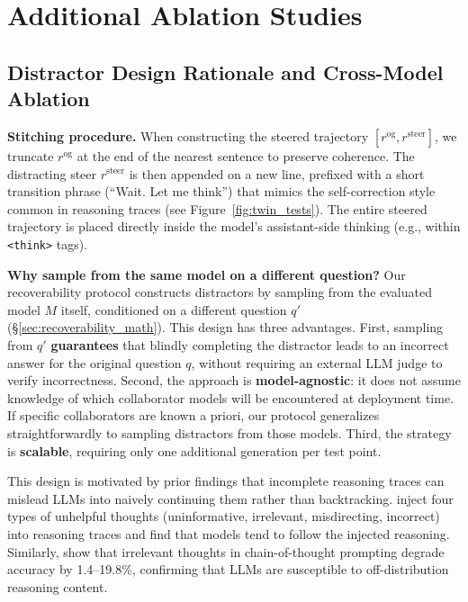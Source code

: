 \documentclass{article} %
\begin{document}
\newpage

\section{Additional Ablation Studies}



\subsection{Distractor Design Rationale and Cross-Model Ablation}
\label{sec:distractor_rationale}

\textbf{Stitching procedure.} When constructing the steered trajectory $[r^\mathrm{og}, r^\mathrm{steer}]$, we truncate $r^\mathrm{og}$ at the end of the nearest sentence to preserve coherence. The distracting steer $r^\mathrm{steer}$ is then appended on a new line, prefixed with a short transition phrase (``Wait. Let me think'') that mimics the self-correction style common in reasoning traces (see Figure~\ref{fig:twin_tests}). The entire steered trajectory is placed directly inside the model's assistant-side thinking (e.g., within \texttt{<think>} tags).

\textbf{Why sample from the same model on a different question?} Our recoverability protocol constructs distractors by sampling from the evaluated model $M$ itself, conditioned on a different question $q'$ (\S\ref{sec:recoverability_math}). This design has three advantages. First, sampling from $q'$ \textbf{guarantees} that blindly completing the distractor leads to an incorrect answer for the original question $q$, without requiring an external LLM judge to verify incorrectness. Second, the approach is \textbf{model-agnostic}: it does not assume knowledge of which collaborator models will be encountered at deployment time. If specific collaborators are known a priori, our protocol generalizes straightforwardly to sampling distractors from those models. Third, the strategy is \textbf{scalable}, requiring only one additional generation per test point.

This design is motivated by prior findings that incomplete reasoning traces can mislead LLMs into naively continuing them rather than backtracking. \citet{yang2025well} inject four types of unhelpful thoughts (uninformative, irrelevant, misdirecting, incorrect) into reasoning traces and find that models tend to follow the injected reasoning. Similarly, \citet{zhou2024can} show that irrelevant thoughts in chain-of-thought prompting degrade accuracy by 1.4--19.8\%, confirming that LLMs are susceptible to off-distribution reasoning content.
\end{document}
